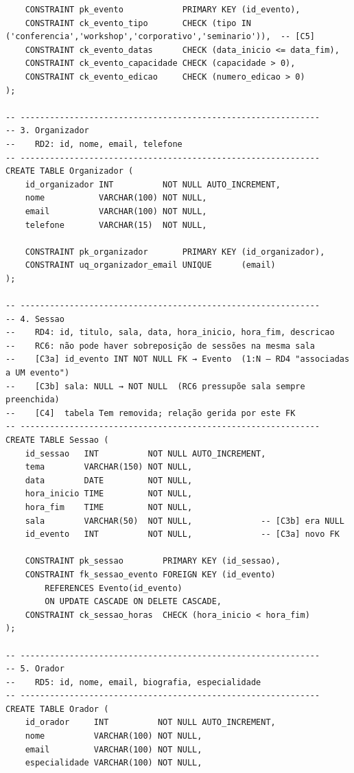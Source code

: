 \documentclass[runningheads]{llncs}
\begin{document}
\begin{small}
\begin{verbatim}
    CONSTRAINT pk_evento            PRIMARY KEY (id_evento),
    CONSTRAINT ck_evento_tipo       CHECK (tipo IN ('conferencia','workshop','corporativo','seminario')),  -- [C5]
    CONSTRAINT ck_evento_datas      CHECK (data_inicio <= data_fim),
    CONSTRAINT ck_evento_capacidade CHECK (capacidade > 0),
    CONSTRAINT ck_evento_edicao     CHECK (numero_edicao > 0)
);

-- -------------------------------------------------------------
-- 3. Organizador
--    RD2: id, nome, email, telefone
-- -------------------------------------------------------------
CREATE TABLE Organizador (
    id_organizador INT          NOT NULL AUTO_INCREMENT,
    nome           VARCHAR(100) NOT NULL,
    email          VARCHAR(100) NOT NULL,
    telefone       VARCHAR(15)  NOT NULL,

    CONSTRAINT pk_organizador       PRIMARY KEY (id_organizador),
    CONSTRAINT uq_organizador_email UNIQUE      (email)
);

-- -------------------------------------------------------------
-- 4. Sessao
--    RD4: id, titulo, sala, data, hora_inicio, hora_fim, descricao
--    RC6: não pode haver sobreposição de sessões na mesma sala
--    [C3a] id_evento INT NOT NULL FK → Evento  (1:N — RD4 "associadas a UM evento")
--    [C3b] sala: NULL → NOT NULL  (RC6 pressupõe sala sempre preenchida)
--    [C4]  tabela Tem removida; relação gerida por este FK
-- -------------------------------------------------------------
CREATE TABLE Sessao (
    id_sessao   INT          NOT NULL AUTO_INCREMENT,
    tema        VARCHAR(150) NOT NULL,
    data        DATE         NOT NULL,
    hora_inicio TIME         NOT NULL,
    hora_fim    TIME         NOT NULL,
    sala        VARCHAR(50)  NOT NULL,              -- [C3b] era NULL
    id_evento   INT          NOT NULL,              -- [C3a] novo FK

    CONSTRAINT pk_sessao        PRIMARY KEY (id_sessao),
    CONSTRAINT fk_sessao_evento FOREIGN KEY (id_evento)
        REFERENCES Evento(id_evento)
        ON UPDATE CASCADE ON DELETE CASCADE,
    CONSTRAINT ck_sessao_horas  CHECK (hora_inicio < hora_fim)
);

-- -------------------------------------------------------------
-- 5. Orador
--    RD5: id, nome, email, biografia, especialidade
-- -------------------------------------------------------------
CREATE TABLE Orador (
    id_orador     INT          NOT NULL AUTO_INCREMENT,
    nome          VARCHAR(100) NOT NULL,
    email         VARCHAR(100) NOT NULL,
    especialidade VARCHAR(100) NOT NULL,


\end{verbatim}
\end{small}
\end{document}
